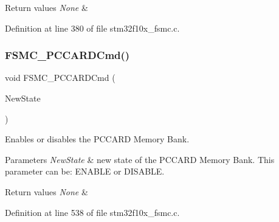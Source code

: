 \begin{DoxyRetVals}{Return values}
{\em None} & \\
\hline
\end{DoxyRetVals}


Definition at line 380 of file stm32f10x\+\_\+fsmc.\+c.

\mbox{\label{group___f_s_m_c___private___functions_ga2d410151ceb3428c6a1bf374a0472cde}} 
\subsubsection{\texorpdfstring{F\+S\+M\+C\+\_\+\+P\+C\+C\+A\+R\+D\+Cmd()}{FSMC\_PCCARDCmd()}}
{\footnotesize\ttfamily void F\+S\+M\+C\+\_\+\+P\+C\+C\+A\+R\+D\+Cmd (\begin{DoxyParamCaption}\item[{\hyperlink{group___exported__types_gac9a7e9a35d2513ec15c3b537aaa4fba1}{Functional\+State}}]{New\+State }\end{DoxyParamCaption})}



Enables or disables the P\+C\+C\+A\+RD Memory Bank. 


\begin{DoxyParams}{Parameters}
{\em New\+State} & new state of the P\+C\+C\+A\+RD Memory Bank. This parameter can be\+: E\+N\+A\+B\+LE or D\+I\+S\+A\+B\+LE. \\
\hline
\end{DoxyParams}

\begin{DoxyRetVals}{Return values}
{\em None} & \\
\hline
\end{DoxyRetVals}


Definition at line 538 of file stm32f10x\+\_\+fsmc.\+c.

\mbox{\label{group___f_s_m_c___private___functions_ga2f53ccf3a4f3c80a5a56fb47ccd47ccd}} 
